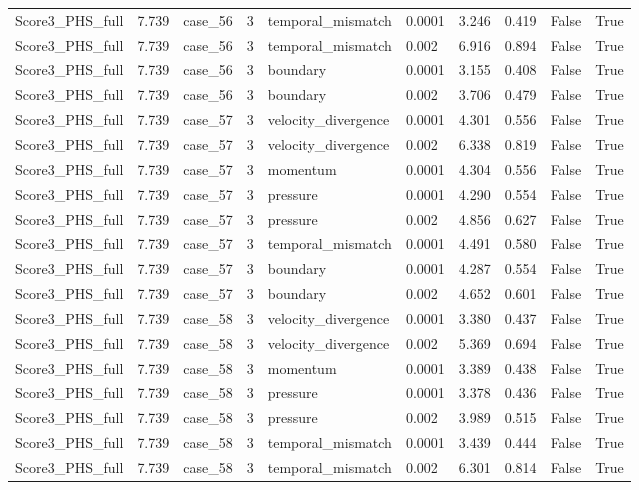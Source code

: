 \begin{longtable}{llllllllll}
Score3\_PHS\_full & 7.739 & case\_56 & 3 & temporal\_mismatch & 0.0001 & 3.246 & 0.419 & False & True \\
Score3\_PHS\_full & 7.739 & case\_56 & 3 & temporal\_mismatch & 0.002 & 6.916 & 0.894 & False & True \\
Score3\_PHS\_full & 7.739 & case\_56 & 3 & boundary & 0.0001 & 3.155 & 0.408 & False & True \\
Score3\_PHS\_full & 7.739 & case\_56 & 3 & boundary & 0.002 & 3.706 & 0.479 & False & True \\
Score3\_PHS\_full & 7.739 & case\_57 & 3 & velocity\_divergence & 0.0001 & 4.301 & 0.556 & False & True \\
Score3\_PHS\_full & 7.739 & case\_57 & 3 & velocity\_divergence & 0.002 & 6.338 & 0.819 & False & True \\
Score3\_PHS\_full & 7.739 & case\_57 & 3 & momentum & 0.0001 & 4.304 & 0.556 & False & True \\
Score3\_PHS\_full & 7.739 & case\_57 & 3 & pressure & 0.0001 & 4.290 & 0.554 & False & True \\
Score3\_PHS\_full & 7.739 & case\_57 & 3 & pressure & 0.002 & 4.856 & 0.627 & False & True \\
Score3\_PHS\_full & 7.739 & case\_57 & 3 & temporal\_mismatch & 0.0001 & 4.491 & 0.580 & False & True \\
Score3\_PHS\_full & 7.739 & case\_57 & 3 & boundary & 0.0001 & 4.287 & 0.554 & False & True \\
Score3\_PHS\_full & 7.739 & case\_57 & 3 & boundary & 0.002 & 4.652 & 0.601 & False & True \\
Score3\_PHS\_full & 7.739 & case\_58 & 3 & velocity\_divergence & 0.0001 & 3.380 & 0.437 & False & True \\
Score3\_PHS\_full & 7.739 & case\_58 & 3 & velocity\_divergence & 0.002 & 5.369 & 0.694 & False & True \\
Score3\_PHS\_full & 7.739 & case\_58 & 3 & momentum & 0.0001 & 3.389 & 0.438 & False & True \\
Score3\_PHS\_full & 7.739 & case\_58 & 3 & pressure & 0.0001 & 3.378 & 0.436 & False & True \\
Score3\_PHS\_full & 7.739 & case\_58 & 3 & pressure & 0.002 & 3.989 & 0.515 & False & True \\
Score3\_PHS\_full & 7.739 & case\_58 & 3 & temporal\_mismatch & 0.0001 & 3.439 & 0.444 & False & True \\
Score3\_PHS\_full & 7.739 & case\_58 & 3 & temporal\_mismatch & 0.002 & 6.301 & 0.814 & False & True \\

\end{longtable}
